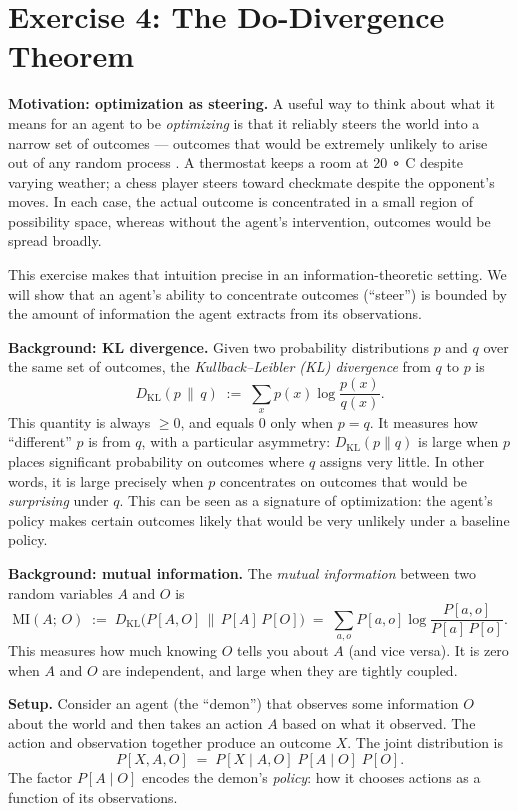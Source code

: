 \documentclass[8pt]{article}
\begin{document}
\section{Exercise 4: The Do-Divergence Theorem}

\noindent
\textbf{Motivation: optimization as steering.} A useful way to think about what it
means for an agent to be \emph{optimizing} is that it reliably steers the world into
a narrow set of outcomes --- outcomes that would be extremely unlikely to arise out of any random process . A thermostat keeps a room at 
20
∘
C
 despite varying weather; a
chess player steers toward checkmate despite the opponent's moves. In each case, the
actual outcome is concentrated in a small region of possibility space, whereas without
the agent's intervention, outcomes would be spread broadly.

\medskip
\noindent
This exercise makes that intuition precise in an information-theoretic setting. We
will show that an agent's ability to concentrate outcomes (``steer'') is bounded by
the amount of information the agent extracts from its observations. 

\medskip
\noindent
\textbf{Background: KL divergence.} Given two probability distributions $p$ and $q$
over the same set of outcomes, the \emph{Kullback--Leibler (KL) divergence} from $q$
to $p$ is
\[
  D_{\mathrm{KL}}(p \,\|\, q) \;:=\;
  \sum_x p(x) \log \frac{p(x)}{q(x)}.
\]
This quantity is always $\geq 0$, and equals $0$ only when $p = q$. It measures how
``different'' $p$ is from $q$, with a particular asymmetry: $D_{\mathrm{KL}}(p \| q)$
is large when $p$ places significant probability on outcomes where $q$ assigns very
little. In other words, it is large precisely when $p$ concentrates on outcomes that
would be \emph{surprising} under $q$. This can be seen as a signature of optimization:
the agent's policy makes certain outcomes likely that would be very unlikely under a
baseline policy.

\medskip
\noindent
\textbf{Background: mutual information.} The \emph{mutual information} between two
random variables $A$ and $O$ is
\[
  \mathrm{MI}(A;\, O) \;:=\;
  D_{\mathrm{KL}}\bigl(P[A, O] \,\big\|\, P[A]\,P[O]\bigr)
  \;=\; \sum_{a, o} P[a, o] \log \frac{P[a, o]}{P[a]\,P[o]}.
\]
This measures how much knowing $O$ tells you about $A$ (and vice versa). It is zero
when $A$ and $O$ are independent, and large when they are tightly coupled.

\medskip
\noindent
\textbf{Setup.} Consider an agent (the ``demon'') that observes some information $O$
about the world and then takes an action $A$ based on what it observed. The action and
observation together produce an outcome $X$. The joint distribution is
\[
  P[X, A, O] \;=\; P[X \mid A, O]\; P[A \mid O]\; P[O].
\]
The factor $P[A \mid O]$ encodes the demon's \emph{policy}: how it chooses actions as
a function of its observations.
\end{document}
